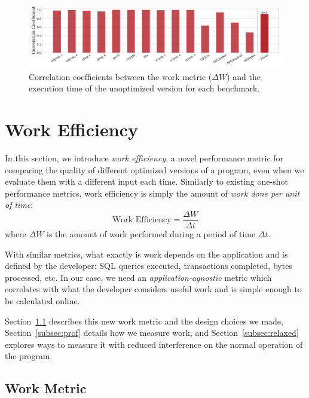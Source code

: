 
\begin{figure}[t]
    \centering
    \includegraphics[width=\textwidth]{figs/corr_coeff.pdf}
    \caption{Correlation coefficients between the work metric ($\Delta W$) and the execution time of the unoptimized version for each benchmark.}
    \label{fig:motivation-speedups}
\end{figure}


\section{Work Efficiency} \label{sec:work}

    In this section, we introduce \textit{work efficiency}, a novel performance metric for comparing the quality of different optimized
    versions of a program, even when we evaluate them with a different input each time. Similarly to existing one-shot performance metrics,
    work efficiency is simply the amount of \textit{work done per unit of time}:
    \[
        \textrm{Work Efficiency} = \frac{\Delta W}{\Delta t}
    \]
    where $\Delta W$ is the amount of work performed during a period of time $\Delta t$.

    With similar metrics, what exactly is work depends on the application and is defined by the developer: SQL queries executed,
    transactions completed, bytes processed, etc. In our case, we need an \emph{application-agnostic} metric which correlates with what
    the developer considers useful work and is simple enough to be calculated online.

    Section~\ref{subsec:workmetric} describes this new work metric and the design choices we made, Section~\ref{subsec:prof} details how
    we measure work, and Section~\ref{subsec:relaxed} explores ways to measure it with reduced interference on %
    the normal operation of the program.

    \subsection{Work Metric} \label{subsec:workmetric}

